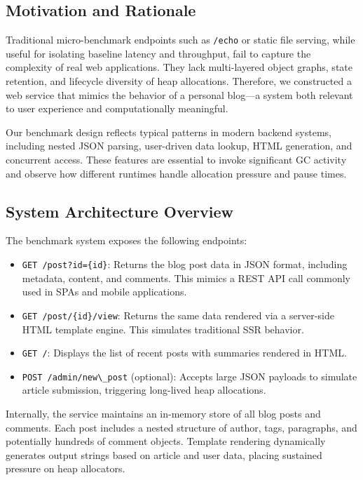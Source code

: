 \subsection{Motivation and Rationale}

Traditional micro-benchmark endpoints such as \verb|/echo| or static file serving, while useful for isolating baseline latency and throughput, fail to capture the complexity of real web applications. They lack multi-layered object graphs, state retention, and lifecycle diversity of heap allocations. Therefore, we constructed a web service that mimics the behavior of a personal blog---a system both relevant to user experience and computationally meaningful.

Our benchmark design reflects typical patterns in modern backend systems, including nested JSON parsing, user-driven data lookup, HTML generation, and concurrent access. These features are essential to invoke significant GC activity and observe how different runtimes handle allocation pressure and pause times.

\subsection{System Architecture Overview}

The benchmark system exposes the following endpoints:

\begin{itemize}
\item \verb|GET /post?id={id}|: Returns the blog post data in JSON format, including metadata, content, and comments. This mimics a REST API call commonly used in SPAs and mobile applications.
\item \verb|GET /post/{id}/view|: Returns the same data rendered via a server-side HTML template engine. This simulates traditional SSR behavior.
\item \verb|GET /|: Displays the list of recent posts with summaries rendered in HTML.
\item \verb|POST /admin/new\_post| (optional): Accepts large JSON payloads to simulate article submission, triggering long-lived heap allocations.
\end{itemize}

Internally, the service maintains an in-memory store of all blog posts and comments. Each post includes a nested structure of author, tags, paragraphs, and potentially hundreds of comment objects. Template rendering dynamically generates output strings based on article and user data, placing sustained pressure on heap allocators.

